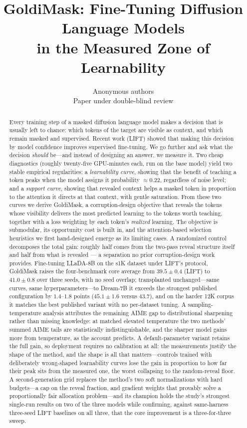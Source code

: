\documentclass{article} %
\title{GoldiMask: Fine-Tuning Diffusion Language Models\\in the Measured Zone of Learnability}
\author{Anonymous authors\\
Paper under double-blind review}
\begin{document}
\maketitle

\begin{abstract}
Every training step of a masked diffusion language model makes a decision that is usually left to chance: which tokens of the target are visible as context, and which remain masked and supervised. Recent work (LIFT) showed that making this decision by model confidence improves supervised fine-tuning. We go further and ask what the decision \emph{should} be---and instead of designing an answer, we measure it. Two cheap diagnostics (roughly twenty-five GPU-minutes each, run on the base model) yield two stable empirical regularities: a \emph{learnability curve}, showing that the benefit of teaching a token peaks when the model assigns it probability $\approx 0.22$, regardless of noise level; and a \emph{support curve}, showing that revealed context helps a masked token in proportion to the attention it directs at that context, with gentle saturation. From these two curves we derive GoldiMask, a corruption-design objective that reveals the tokens whose visibility delivers the most predicted learning to the tokens worth teaching, together with a loss weighting by each token's \emph{realized} learning. The objective is submodular, its opportunity cost is built in, and the attention-based selection heuristics we first hand-designed emerge as its limiting cases. A randomized control decomposes the total gain: roughly half comes from the two-pass reveal structure itself and half from what is revealed --- a separation no prior corruption-design work provides. Fine-tuning LLaDA-8B on the s1K dataset under LIFT's protocol, GoldiMask raises the four-benchmark core average from $39.5 \pm 0.4$ (LIFT) to $41.0 \pm 0.8$ over three seeds, with no seed overlap; transplanted unchanged---same curves, same hyperparameters---to Dream-7B it exceeds the strongest published configuration by $1.4$--$1.8$ points ($45.1 \pm 1.6$ versus $43.7$), and on the harder 12K corpus it matches the best published variant with no per-dataset tuning. A sampling-temperature analysis attributes the remaining AIME gap to distributional sharpening rather than missing knowledge: at matched elevated temperature the two methods' summed AIME tails are statistically indistinguishable, and the sharper model gains more from temperature, as the account predicts. A default-parameter variant retains the full gain, so deployment requires no calibration at all: the measurements justify the shape of the method, and the shape is all that matters---controls trained with deliberately wrong-shaped learnability curves lose the gain in proportion to how far their peak sits from the measured one, the worst collapsing to the random-reveal floor. A second-generation grid replaces the method's two soft normalizations with hard budgets---a cap on the reveal fraction, and gradient weights that provably solve a proportionally fair allocation problem---and its champion holds the study's strongest single-run results on two of the three models while confirming, against same-harness three-seed LIFT baselines on all three, that the core improvement is a three-for-three sweep.

\end{abstract}
\end{document}
